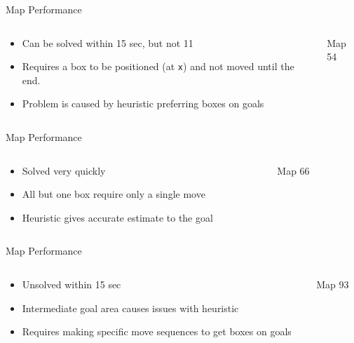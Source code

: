 \documentclass{beamer}
\begin{document}
\begin{frame}{Map Performance}
  \begin{columns}
    \begin{column}{.5\textwidth}
       \begin{itemize}
       \item Can be solved within 15 sec, but not 11
       \item Requires a box to be positioned (at \texttt{x}) and not moved until the end.
       \item Problem is caused by heuristic preferring boxes on goals
       \end{itemize}
    \end{column}
    \begin{column}{.5\textwidth}
    \begin{block}{Map 54}
      \centering
      \usebox{\mapff}
    \end{block}
    \end{column}
  \end{columns}
\end{frame}

\begin{frame}{Map Performance}
  \begin{columns}
    \begin{column}{.5\textwidth}
      \begin{itemize}
      \item Solved very quickly
      \item All but one box require only a single move
      \item Heuristic gives accurate estimate to the goal
      \end{itemize}
    \end{column}
    \begin{column}{.5\textwidth}
      \begin{block}{Map 66}
        \centering
        \usebox{\mapss}
      \end{block}
    \end{column}
  \end{columns}
\end{frame}

\begin{frame}{Map Performance}
  \begin{columns}
    \begin{column}{.5\textwidth}
      \begin{itemize}
      \item Unsolved within 15 sec
      \item Intermediate goal area causes issues with heuristic
      \item Requires making specific move sequences to get boxes on goals
      \end{itemize}
    \end{column}
    \begin{column}{.5\textwidth}
      \begin{block}{Map 93}
        \centering
        \usebox{\mapnt}
      \end{block}
    \end{column}
  \end{columns}
\end{frame}
\end{document}
